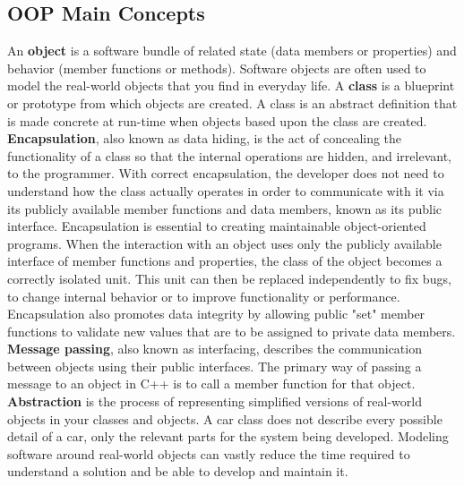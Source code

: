 \documentclass{report}
\begin{document}
    \pagebreak 
    \bigbreak \noindent 
    \subsection{OOP Main Concepts}
    \bigbreak \noindent 
    An \textbf{object} is a software bundle of related state (data members or properties) and behavior (member functions or methods). Software objects are often used to model the real-world objects that you find in everyday life.
    \bigbreak \noindent 
    A \textbf{class} is a blueprint or prototype from which objects are created. A class is an abstract definition that is made concrete at run-time when objects based upon the class are created.
    \bigbreak \noindent 
    \textbf{Encapsulation}, also known as data hiding, is the act of concealing the functionality of a class so that the internal operations are hidden, and irrelevant, to the programmer. With correct encapsulation, the developer does not need to understand how the class actually operates in order to communicate with it via its publicly available member functions and data members, known as its public interface. Encapsulation is essential to creating maintainable object-oriented programs. When the interaction with an object uses only the publicly available interface of member functions and properties, the class of the object becomes a correctly isolated unit. This unit can then be replaced independently to fix bugs, to change internal behavior or to improve functionality or performance. Encapsulation also promotes data integrity by allowing public "set" member functions to validate new values that are to be assigned to private data members.
    \bigbreak \noindent 
    \textbf{Message passing}, also known as interfacing, describes the communication between objects using their public interfaces. The primary way of passing a message to an object in C++ is to call a member function for that object.
    \bigbreak \noindent 
    \textbf{Abstraction} is the process of representing simplified versions of real-world objects in your classes and objects. A car class does not describe every possible detail of a car, only the relevant parts for the system being developed. Modeling software around real-world objects can vastly reduce the time required to understand a solution and be able to develop and maintain it.
    \bigbreak \noindent 
\end{document}
